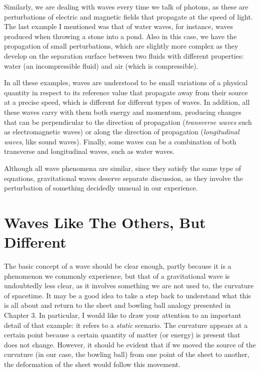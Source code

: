 Similarly, we are dealing with waves every time we talk of photons,
as these are perturbations of electric and magnetic fields that propagate at the speed
of light. The last example I mentioned was that of water waves, for instance, waves
produced when throwing a stone into a pond. Also in this case, we have the propagation
of small perturbations, which are slightly more complex as they develop on the
separation surface between two fluids with different properties:
water (an incompressible fluid) and air (which is
compressible).

In all these examples, waves are understood to be small variations of a physical
quantity in respect to its reference value that propagate away from their source at a
precise speed, which is different for different types of waves. In addition, all these
waves carry with them both energy and momentum, producing changes
that can be perpendicular to the direction of propagation (\emph{transverse
waves} such as electromagnetic waves) or along the direction of
propagation (\emph{longitudinal waves}, like sound waves). Finally,
some waves can be a combination of both transverse and longitudinal waves, such as water
waves.

Although all wave phenomena are similar, since they satisfy the same type of equations,
gravitational waves deserve separate discussion, as they involve the perturbation of
something decidedly unusual in our experience.

\section{Waves Like The Others, But Different}\label{sec:08-waves}

The basic concept of a wave should be clear enough, partly because it is a phenomenon we
commonly experience, but that of a gravitational wave is undoubtedly less clear, as it
involves something we are not used to, the curvature of spacetime. It may be a good idea
to take a step back to understand what this is all about and return to the sheet and
bowling ball analogy presented in Chapter 3. In particular, I would like to draw your
attention to an important detail of that example: it refers to a \emph{static} scenario.
The curvature appears at a certain point because a certain quantity of matter (or
energy) is present that does not change. However, it should be evident that if we moved
the source of the curvature (in our case, the bowling ball) from one point of the sheet
to another, the deformation of the sheet would follow this movement.

